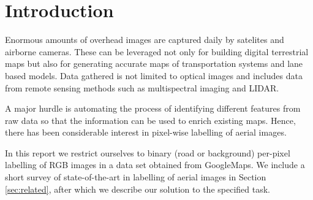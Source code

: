 \section{Introduction}

Enormous amounts of overhead images are captured daily by satelites and
airborne cameras. These can be leveraged not only for building digital
terrestrial maps but also for generating accurate maps of transportation
systems and lane based models. Data gathered is not limited to optical images
and includes data from remote sensing methods such as multispectral imaging and
LIDAR. 

A major hurdle is automating the process of identifying different features from
raw data so that the information can be used to enrich existing maps. Hence,
there has been considerable interest in pixel-wise labelling of aerial images.

In this report we restrict ourselves to binary (road or background) per-pixel
labelling of RGB images in a data set obtained from GoogleMaps. We include a
short survey of state-of-the-art in labelling of aerial images in Section
\ref{sec:related}, after which we describe our solution to the specified task.

